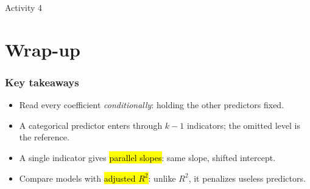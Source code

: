 \documentclass[slidestop,compress,mathserif]{beamer}
\begin{document}
\begin{frame}{Activity 4}
\end{frame}
\section{Wrap-up}
\begin{frame}
\frametitle{Key takeaways}

\begin{itemize}
\item Read every coefficient \emph{conditionally}: holding the other predictors fixed.
\item A categorical predictor enters through $k-1$ indicators; the omitted level is the reference.
\item A single indicator gives \hl{parallel slopes}: same slope, shifted intercept.
\item Compare models with \hl{adjusted $R^2$}: unlike $R^2$, it penalizes useless predictors.
\end{itemize}

\end{frame}


\end{document}
